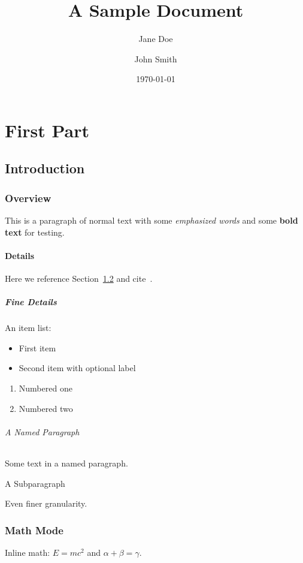 \documentclass[12pt]{article}
\title{A Sample Document}
\author{Jane Doe \and John Smith}
\date{\today}
\begin{document}
\maketitle
\tableofcontents

\part{First Part}

\chapter{Introduction}

\section{Overview}
This is a paragraph of normal text with some \emph{emphasized words}
and some \textbf{bold text} for testing.

\subsection{Details}
Here we reference Section~\ref{sec:math} and cite~\cite{knuth1984}.

\subsubsection{Fine Details}
An item list:
\begin{itemize}
  \item First item
  \item[*] Second item with optional label
\end{itemize}

\begin{enumerate}
  \item Numbered one
  \item Numbered two
\end{enumerate}

\paragraph{A Named Paragraph}
Some text in a named paragraph.

\subparagraph{A Subparagraph}
Even finer granularity.

\section{Math Mode}\label{sec:math}
Inline math: $E = mc^2$ and $\alpha + \beta = \gamma$.
\end{document}
